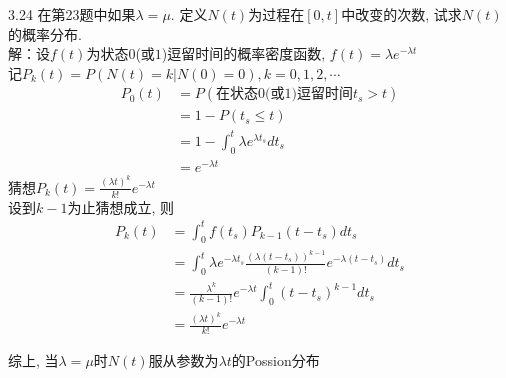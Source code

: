 3.24 在第23题中如果$\lambda = \mu$. 定义$N(t)$为过程在$[0,t]$中改变的次数, 试求$N(t)$的概率分布.\\
解：设$f(t)$为状态$0$(或$1$)逗留时间的概率密度函数, $f(t) = \lambda e^{-\lambda t}$\\
	记$P_k(t) = P\left(N(t) = k | N(0) = 0 \right), k = 0,1,2,\cdots$\\
	\[
	\begin{split}
	P_0(t) & = P(\text{在状态$0$(或$1$)逗留时间$t_s > t$})\\
			& = 1 - P(t_s \leqslant t)\\
			& = 1-\int^t_0 \lambda e^{\lambda t_s}dt_s\\
			& = e^{-\lambda t}
	\end{split}
	\]
	猜想$P_k(t) = \frac{(\lambda t)^k}{k!} e^{-\lambda t}$\\
	设到$k-1$为止猜想成立, 则
	\[
	\begin{split}
	P_k(t) & = \int^t_0 f(t_s)P_{k-1}(t-t_s)dt_s\\
			& = \int^t_0 \lambda e^{-\lambda t_s} \frac{\left(\lambda(t-t_s)\right)^{k-1}}{(k-1)!} e^{-\lambda(t-t_s)}dt_s\\
			& = \frac{{\lambda}^k}{(k-1)!} e^{-\lambda t}\int^t_0(t-t_s)^{k-1}dt_s\\
			& = \frac{(\lambda t)^k}{k!}e^{-\lambda t}
	\end{split}
	\]
	
综上, 当$\lambda = \mu$时$N(t)$服从参数为$\lambda t$的Possion分布










